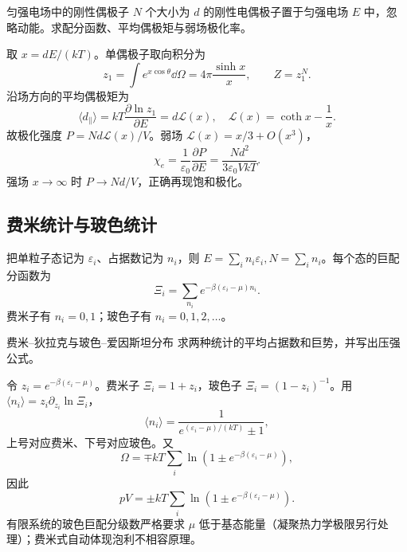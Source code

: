 \begin{advexamplebox}{匀强电场中的刚性偶极子}\label{advA2:ex:dipole-partition}
$N$ 个大小为 $d$ 的刚性电偶极子置于匀强电场 $E$ 中，忽略动能。求配分函数、平均偶极矩与弱场极化率。

\AQDipoleStatistics
\end{advexamplebox}
\begin{advsolution}
\AADipoleStatistics

取 $x=dE/(kT)$。单偶极子取向积分为
\[
 z_1=\int e^{x\cos\theta}\dd\Omega
 =4\pi\frac{\sinh x}{x},
 \qquad Z=z_1^N.
\]
沿场方向的平均偶极矩为
\[
 \langle d_\parallel\rangle
 =kT\frac{\partial\ln z_1}{\partial E}
 =d\mathcal L(x),
 \quad \mathcal L(x)=\coth x-\frac1x.
\]
故极化强度
$P=Nd\mathcal L(x)/V$。弱场 $\mathcal L(x)=x/3+O(x^3)$，
\[
 \boxed{\chi_e=\frac1{\varepsilon_0}\frac{\partial P}{\partial E}
 =\frac{Nd^2}{3\varepsilon_0VkT}}.
\]
强场 $x\to\infty$ 时 $P\to Nd/V$，正确再现饱和极化。
\end{advsolution}

\subsection{费米统计与玻色统计}

把单粒子态记为 $\varepsilon_i$、占据数记为 $n_i$，则
$E=\sum_i n_i\varepsilon_i,N=\sum_i n_i$。每个态的巨配分函数为
\[
 \Xi_i=\sum_{n_i}e^{-\beta(\varepsilon_i-\mu)n_i}.
\]
费米子有 $n_i=0,1$；玻色子有 $n_i=0,1,2,\ldots$。

\begin{advexamplebox}{费米--狄拉克与玻色--爱因斯坦分布}\label{advA2:ex:quantum-distributions}
求两种统计的平均占据数和巨势，并写出压强公式。

\AQQuantumDistributions
\end{advexamplebox}
\begin{advsolution}
\AAQuantumDistributions

令 $z_i=e^{-\beta(\varepsilon_i-\mu)}$。费米子
$\Xi_i=1+z_i$，玻色子 $\Xi_i=(1-z_i)^{-1}$。用
$\langle n_i\rangle=z_i\partial_{z_i}\ln\Xi_i$，
\[
 \boxed{\langle n_i\rangle=\frac1{e^{(\varepsilon_i-\mu)/(kT)}\pm1}},
\]
上号对应费米、下号对应玻色。又
\[
 \boxed{\Omega=\mp kT\sum_i\ln\!\left(1\pm e^{-\beta(\varepsilon_i-\mu)}\right)},
\]
因此
\[
 \boxed{pV=\pm kT\sum_i\ln\!\left(1\pm e^{-\beta(\varepsilon_i-\mu)}\right)}.
\]
有限系统的玻色巨配分级数严格要求 $\mu$ 低于基态能量（凝聚热力学极限另行处理）；费米式自动体现泡利不相容原理。
\end{advsolution}

